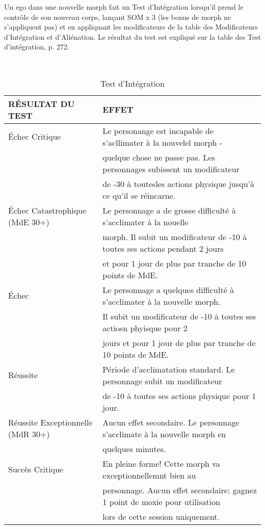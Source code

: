 Un ego dans une nouvelle morph fait un Test d'Intégration lorsqu'il prend le contrôle de son nouveau corps, lançant SOM x 3 (les bonus de morph ne s'appliquent pas) et en appliquant les modificateurs de la table des Modificateurs d'Intégration et d'Aliénation. Le résultat du test est expliqué sur la table des Test d'intégration, p. 272. 

\\ 



\begin{table} \caption{Test d'Intégration} \begin{tabular}{|l|l|} 



\hline

RÉSULTAT DU TEST &EFFET\\ \hline

Échec Critique &Le personange est incapable de s'acllimater à la nouvelel morph - \\ &quelque chose ne passe pas. Les personnages subissent un modificateur\\ &de -30 à toutesles actions physique jusqu'à ce qu'il se réincarne. \\ \hline

Échec Catastrophique (MdE 30+) &Le personnage a de grosse difficulté à s'acclimater à la nouelle\\ &morph. Il subit un modificateur de -10 à toutes ses actions pendant 2 jours\\ &et pour 1 jour de plus par tranche de 10 points de MdE. \\ \hline

Échec &Le personnage a quelques difficulté à s'acclimater à la nouvelle morph. \\ &Il subit un modificateur de -10 à toutes ses actiosn phyisque pour 2\\ &jours et pour 1 jour de plus par tranche de 10 points de MdE. \\ \hline

Réussite &Période d'acclimatation standard. Le personnage subit un modificateur\\ &de -10 à toutes ses actions physique pour 1 jour. \\ \hline

Réussite Exceptionnelle (MdR 30+) &Aucun effet secondaire. Le personnage s'acclimate à la nouvelle morph en \\ &quelques minutes. \\ \hline

Succès Critique &En pleine forme! Cette morph va exceptionnellemnt bien au\\ &personnage. Aucun effet secondaire; gagnez 1 point de moxie pour utilisation\\ &lors de cette session uniquement. \\ \hline

\end{tabular} \end{table} 

